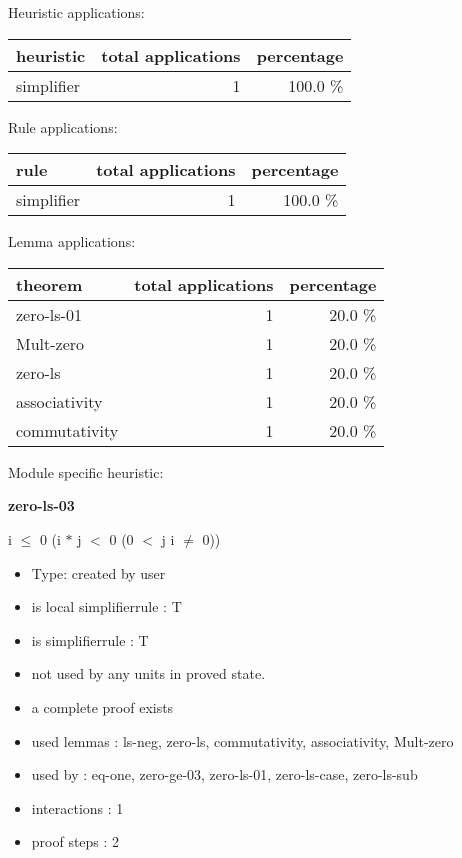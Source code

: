 \documentclass[a4paper]{article}
\begin{document}
\medskip


Heuristic applications:

\begin{supertabular}{l|r|r}
heuristic	& total applications & percentage \\ \hline
simplifier & 1 & 100.0 \% \\

\end{supertabular}

Rule applications:

\begin{supertabular}{l|r|r}
rule	        & total applications & percentage \\ \hline
simplifier & 1 & 100.0 \% \\

\end{supertabular}

Lemma applications:

\begin{supertabular}{l|r|r}
theorem	        & total applications & percentage \\ \hline
zero-ls-01 & 1 & 20.0 \% \\
Mult-zero & 1 & 20.0 \% \\
zero-ls & 1 & 20.0 \% \\
associativity & 1 & 20.0 \% \\
commutativity & 1 & 20.0 \% \\

\end{supertabular}

Module specific heuristic:

\pagebreak

{\LARGE\bf zero-ls-03}\label{lemma-zero-ls-03}

\medskip

 \Fol i $\le$ 0 \Imp (i $*$ j $<$ 0 \Equiv \Not \Not (0 $<$ j \And i $\neq$ 0))

\begin{itemize}

\item Type: created by user

\item is local simplifierrule : T
\item is simplifierrule : T
\item not used by any units in proved state.
\item       a complete proof exists
\item       used lemmas  : ls-neg, zero-ls, commutativity, associativity, Mult-zero
\item       used by      : eq-one, zero-ge-03, zero-ls-01, zero-ls-case, zero-ls-sub
\item       interactions : 1
\item       proof steps  : 2
\end{itemize}
\end{document}
